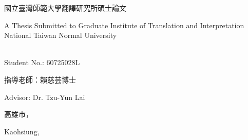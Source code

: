 \makeatletter
\begin{titlepage}%
  \begin{center}%
    {\large 國立臺灣師範大學翻譯研究所碩士論文\par}

    {\large A Thesis Submitted to Graduate Institute of Translation and Interpretation National Taiwan Normal University\par}
    \par
  \end{center}%
  \vspace{1cm plus 1fill}
  \begin{flushleft}%
    {{\Large\bfseries \@author}\\
      Student No.: 60725028L\par}
  \end{flushleft}%
  \vspace{8mm plus 1mm minus 2mm}
  \begin{center}%
    {\Large\textbf{\titlezh}\par}\par
    \vspace{1em}
    {\huge\textbf{\@title}\par}
    \vspace{2cm plus 1.5fill}
    {\large 指導老師：賴慈芸博士}\par
    \vspace{0.5em}
    {\large Advisor: Dr. Tzu-Yun Lai}\par
    \vspace{2cm}
    {\large 高雄市，\zhtoday}\par
    \vspace{0.5em}
    {\large Kaohsiung, \@date}
  \end{center}
\end{titlepage}%
\makeatother
